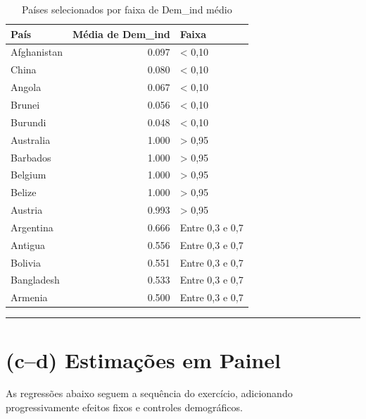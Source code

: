 \documentclass[
  portuguese,
  letterpaper,
  DIV=11,
  numbers=noendperiod]{scrartcl}
\begin{document}
\begin{table}
\centering
\caption{\label{tab:paises-especificos}Países selecionados por faixa de Dem_ind médio}
\centering
\begin{tabular}[t]{l|r|l}
\hline
País & Média de Dem\_ind & Faixa\\
\hline
Afghanistan & 0.097 & < 0,10\\
\hline
China & 0.080 & < 0,10\\
\hline
Angola & 0.067 & < 0,10\\
\hline
Brunei & 0.056 & < 0,10\\
\hline
Burundi & 0.048 & < 0,10\\
\hline
Australia & 1.000 & > 0,95\\
\hline
Barbados & 1.000 & > 0,95\\
\hline
Belgium & 1.000 & > 0,95\\
\hline
Belize & 1.000 & > 0,95\\
\hline
Austria & 0.993 & > 0,95\\
\hline
Argentina & 0.666 & Entre 0,3 e 0,7\\
\hline
Antigua & 0.556 & Entre 0,3 e 0,7\\
\hline
Bolivia & 0.551 & Entre 0,3 e 0,7\\
\hline
Bangladesh & 0.533 & Entre 0,3 e 0,7\\
\hline
Armenia & 0.500 & Entre 0,3 e 0,7\\
\hline
\end{tabular}
\end{table}

\begin{center}\rule{0.5\linewidth}{0.5pt}\end{center}

\section{(c--d) Estimações em
Painel}\label{cd-estimauxe7uxf5es-em-painel}

As regressões abaixo seguem a sequência do exercício, adicionando
progressivamente efeitos fixos e controles demográficos.
\end{document}
